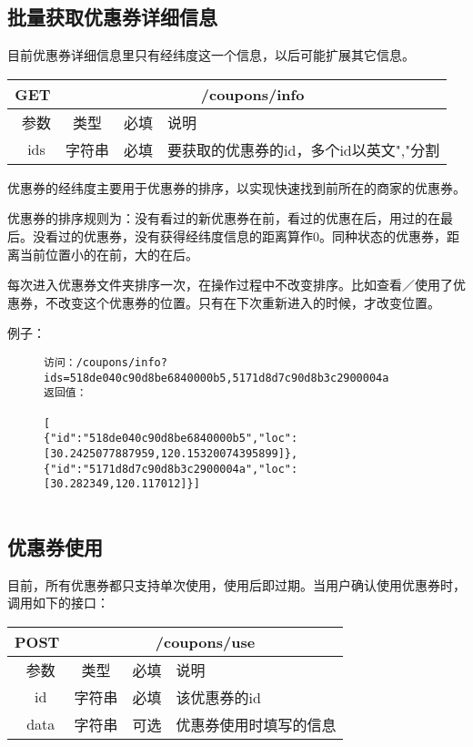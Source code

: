 \subsection{批量获取优惠券详细信息}
目前优惠券详细信息里只有经纬度这一个信息，以后可能扩展其它信息。
\begin{table}[H]
   \begin{center}
\begin{tabular}{|c|c|c|p{12cm}|}
\hline
GET & \multicolumn{3}{|c|}{/coupons/info} \\
\hline\hline
 \  参数  & 类型 & 必填 &  说明  \\
\hline
 \  ids  & 字符串 & 必填 &  要获取的优惠券的id，多个id以英文","分割  \\
 \hline
\end{tabular}
   \end{center}
\end{table}

优惠券的经纬度主要用于优惠券的排序，以实现快速找到前所在的商家的优惠券。

优惠券的排序规则为：没有看过的新优惠券在前，看过的优惠在后，用过的在最后。没看过的优惠券，没有获得经纬度信息的距离算作0。同种状态的优惠券，距离当前位置小的在前，大的在后。

每次进入优惠券文件夹排序一次，在操作过程中不改变排序。比如查看／使用了优惠券，不改变这个优惠券的位置。只有在下次重新进入的时候，才改变位置。

例子：

\begin{figure}[H]
\begin{verbatim}
访问：/coupons/info?ids=518de040c90d8be6840000b5,5171d8d7c90d8b3c2900004a
返回值：

[
{"id":"518de040c90d8be6840000b5","loc":[30.2425077887959,120.15320074395899]},
{"id":"5171d8d7c90d8b3c2900004a","loc":[30.282349,120.117012]}]


\end{verbatim}
\end{figure}







\subsection{优惠券使用}
目前，所有优惠券都只支持单次使用，使用后即过期。当用户确认使用优惠券时，调用如下的接口：
\begin{table}[H]
   \begin{center}
\begin{tabular}{|c|c|c|p{12cm}|}
\hline
POST & \multicolumn{3}{|c|}{/coupons/use} \\
\hline\hline
 \  参数  & 类型 & 必填 &  说明  \\
\hline
 \  id  & 字符串 & 必填 &  该优惠券的id  \\
 \hline
 \  data  & 字符串 & 可选 &  优惠券使用时填写的信息  \\
\hline
\end{tabular}
   \end{center}
\end{table}

